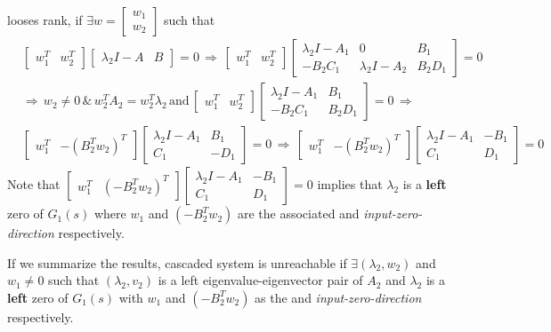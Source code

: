 \documentclass[twoside]{article}
\begin{document}
looses rank, if $\exists w = \begin{bmatrix} w_1 \\ w_2 \end{bmatrix}$ such that 
%
\begin{align*}
	&\begin{bmatrix} w_1^T & w_2^T \end{bmatrix} \left[ \begin{array}{c|c} \lambda_2 I - A & B \end{array} \right]
	= 0 \, \Rightarrow \, 
	\begin{bmatrix} w_1^T & w_2^T \end{bmatrix} \left[ \begin{array}{c|c|c} \lambda_2 I - A_1 & 0 & B_1 \\ \hline -B_2 C_1 & \lambda_2 I - A_2 & B_2 D_1 
	\end{array} \right] = 0
	\\
	&\Rightarrow \, w_2 \neq 0 \, \& \, w_2^T A_2 = w_2^T \lambda_2 
	\, \mathrm{and} \, \begin{bmatrix} w_1^T & w_2^T \end{bmatrix} \left[ \begin{array}{c|c} \lambda_2 I - A_1 & B_1 \\ \hline -B_2 C_1 & B_2 D_1 
	\end{array} \right] = 0 \, \Rightarrow \,
	\\
	&\begin{bmatrix} w_1^T & -(B_2^T w_2)^T \end{bmatrix} \left[ \begin{array}{c|c} \lambda_2 I - A_1 & B_1 \\ \hline C_1 & -D_1 
	\end{array} \right] = 0 \, \Rightarrow \,
	\begin{bmatrix} w_1^T & -(B_2^T w_2)^T \end{bmatrix} \left[ \begin{array}{c|c} \lambda_2 I - A_1 & -B_1 \\ \hline C_1 & D_1 
	\end{array} \right] = 0
\end{align*}
%
Note that $\begin{bmatrix} w_1^T & (-B_2^T w_2)^T \end{bmatrix} \left[ \begin{array}{c|c} \lambda_2 I - A_1 & -B_1 \\ \hline C_1 & D_1 
	\end{array} \right] = 0$
implies that $\lambda_2$ is a \textbf{left} zero of $G_1(s)$ where $w_1$ and $(-B_2^T w_2)$ 
are the associated  and \textit{input-zero-direction} respectively. 

If we summarize the results, cascaded system is unreachable if $\exists (\lambda_2 , w_2)$ and $w_1 \neq 0$
such that $(\lambda_2 , v_2)$ is a left eigenvalue-eigenvector pair of $A_2$ and $\lambda_2$ is a \textbf{left} zero of 
$G_1(s)$ with $w_1$ and $(-B_2^T w_2)$ as the  and \textit{input-zero-direction} respectively. 

\end{document}
